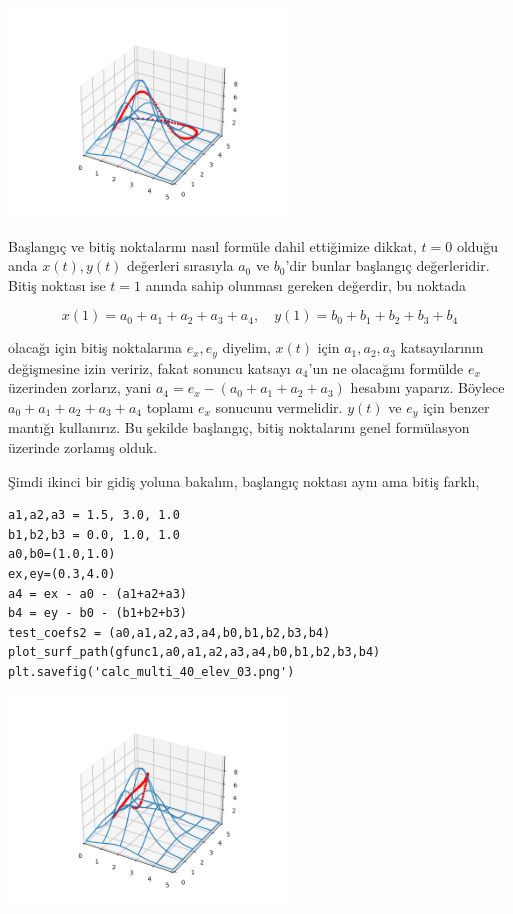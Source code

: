 \documentclass[12pt,fleqn]{article}\usepackage{../../common}
\begin{document}
\includegraphics[width=20em]{calc_multi_40_elev_01.png}

Başlangıç ve bitiş noktalarını nasıl formüle dahil ettiğimize dikkat, $t=0$
olduğu anda $x(t),y(t)$ değerleri sırasıyla $a_0$ ve $b_0$'dir bunlar başlangıç
değerleridir. Bitiş noktası ise $t=1$ anında sahip olunması gereken değerdir,
bu noktada

$$
x(1) = a_0 + a_1 + a_2 + a_3 + a_4 ,\quad
y(1) = b_0 + b_1 + b_2 + b_3 + b_4 
$$

olacağı için bitiş noktalarına $e_x,e_y$ diyelim, $x(t)$ için $a_1,a_2,a_3$
katsayılarının değişmesine izin veririz, fakat sonuncu katsayı $a_4$'un ne
olacağını formülde $e_x$ üzerinden zorlarız, yani $a_4 = e_x - (a_0 + a_1 + a_2
+ a_3)$ hesabını yaparız. Böylece $a_0 + a_1 + a_2 + a_3 + a_4$ toplamı $e_x$
sonucunu vermelidir. $y(t)$ ve $e_y$ için benzer mantığı kullanırız.  Bu şekilde
başlangıç, bitiş noktalarını genel formülasyon üzerinde zorlamış olduk.

Şimdi ikinci bir gidiş yoluna bakalım, başlangıç noktası aynı ama bitiş farklı,

\begin{verbatim}
a1,a2,a3 = 1.5, 3.0, 1.0
b1,b2,b3 = 0.0, 1.0, 1.0
a0,b0=(1.0,1.0)
ex,ey=(0.3,4.0)
a4 = ex - a0 - (a1+a2+a3)
b4 = ey - b0 - (b1+b2+b3)
test_coefs2 = (a0,a1,a2,a3,a4,b0,b1,b2,b3,b4)
plot_surf_path(gfunc1,a0,a1,a2,a3,a4,b0,b1,b2,b3,b4)
plt.savefig('calc_multi_40_elev_03.png')
\end{verbatim}

\includegraphics[width=20em]{calc_multi_40_elev_03.png}
\end{document}

